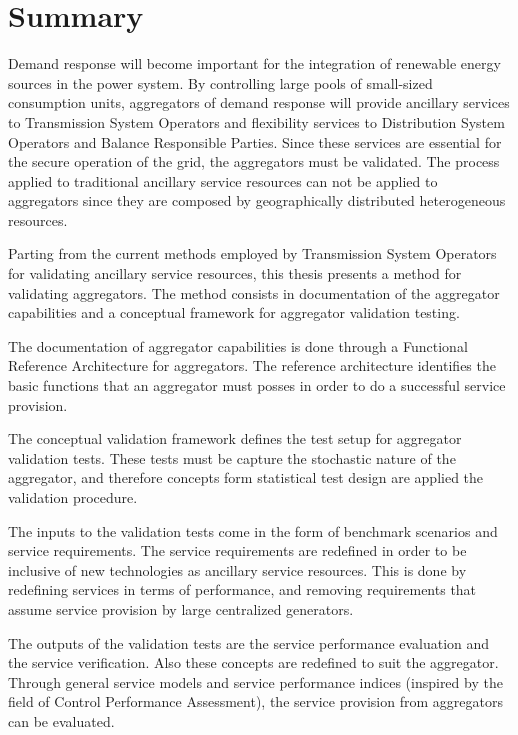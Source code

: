 \chapter{Summary}
Demand response will become important for the integration of renewable energy sources in the power system. By controlling large pools of small-sized consumption units, aggregators of demand response will provide ancillary services to Transmission System Operators and flexibility services to Distribution System Operators and Balance Responsible Parties. Since these services are essential for the secure operation of the grid, the aggregators must be validated. The process applied to traditional ancillary service resources can not be applied to aggregators since they are composed by geographically distributed heterogeneous resources.

Parting from the current methods employed by Transmission System Operators for validating ancillary service resources, this thesis presents a method for validating aggregators. The method consists in documentation of the aggregator capabilities and a conceptual framework for aggregator validation testing. 

The documentation of aggregator capabilities is done through a Functional Reference Architecture for aggregators. The reference architecture identifies the basic functions that an aggregator must posses in order to do a successful service provision. 

The conceptual validation framework defines the test setup for aggregator validation tests. These tests must be capture the stochastic nature of the aggregator, and therefore concepts form statistical test design are applied the validation procedure.

The inputs to the validation tests come in the form of benchmark scenarios and service requirements. The service requirements are redefined in order to be inclusive of new technologies as ancillary service resources. This is done by redefining services in terms of performance, and removing requirements that assume service provision by large centralized generators.

The outputs of the validation tests are the service performance evaluation and the service verification. Also these concepts are redefined to suit the aggregator. Through general service models and service performance indices (inspired by the field of Control Performance Assessment), the service provision from aggregators can be evaluated.


